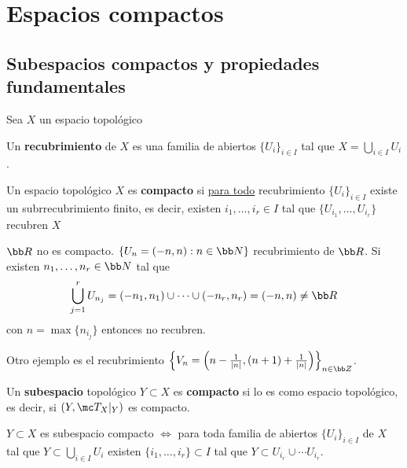 
\chapter{Espacios compactos}
\section{Subespacios compactos y propiedades fundamentales}
Sea $X$ un espacio topol\'ogico
\begin{defi}
    Un \textbf{recubrimiento} de $X$ es una familia de abiertos $\{U_i\}_{i \in I}$ tal que $\displaystyle X = \bigcup_{i \in I} U_i$. 
\end{defi}
\begin{defi}
    Un espacio topol\'ogico $X$ es \textbf{compacto} si \underline{para todo} recubrimiento $\{U_i\}_{i \in I}$ existe un subrrecubrimiento finito, es decir, existen $i_1, \ldots, i_r \in I$ tal que $\{U_{i_1}, \ldots, U_{i_r}\}$ recubren $X$
\end{defi}
\begin{ejem}
$\bb R$ no es compacto. $\{U_n = (-n,n): n \in \bb N\}$ recubrimiento de $\bb R$. Si existen $n_1, \ldots, n_r \in \bb N$ tal que 
$$\bigcup_{j=1}^r U_{n_j} = (-n_1, n_1)\cup \cdots \cup (-n_r,n_r) = (-n,n) \neq \bb R$$
con $n = \max\{n_{i_j}\}$ entonces no recubren.

Otro ejemplo es el recubrimiento $\left\{V_n = \left(n- \frac{1}{|n|}, (n+1) + \frac{1}{|n|} \right)\right\}_{n\in \bb Z}$.
\end{ejem}
\begin{defi}
    Un \textbf{subespacio} topol\'ogico $Y \subset X$ es \textbf{compacto} si lo es como espacio topol\'ogico, es decir, si $(Y, \mc T_X|_Y)$ es compacto.
\end{defi}
\begin{prop}
$Y \subset X$ es subespacio compacto $\iff$ para toda familia de abiertos $\{U_i\}_{i \in I}$ de $X$ tal que $Y \subset \bigcup_{i \in I} U_i$ existen $\{i_1, \ldots, i_r\}\subset I$ tal que $Y \subset U_{i_r} \cup \cdots U_{i_r}$.
\end{prop}
